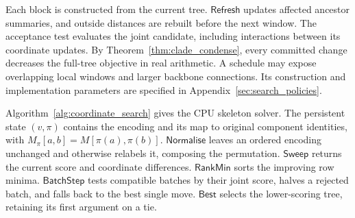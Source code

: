 \documentclass[11pt,a4paper]{article}
\makeatletter
\newcommand{\proc}[1]{\mathsf{#1}}
\DeclareRobustCommand{\_}{\ifmmode\nfss@text{\textunderscore}\else\textunderscore\allowbreak\fi}
\theoremstyle{definition}
\makeatother
\begin{document}
Each block is constructed from the current tree.
$\proc{Refresh}$ updates affected ancestor summaries, and outside distances are rebuilt before the next window.
The acceptance test evaluates the joint candidate, including interactions between its coordinate updates.
By Theorem~\ref{thm:clade_condense}, every committed change decreases the full-tree objective in real arithmetic.
A schedule may expose overlapping local windows and larger backbone connections. Its construction and implementation parameters are specified in Appendix~\ref{sec:search_policies}.

Algorithm~\ref{alg:coordinate_search} gives the CPU skeleton solver.
The persistent state $(v,\pi)$ contains the encoding and its map to original component identities, with $M_\pi[a,b]=M[\pi(a),\pi(b)]$.
$\proc{Normalise}$ leaves an ordered encoding unchanged and otherwise relabels it, composing the permutation.
$\proc{Sweep}$ returns the current score and coordinate differences. $\proc{RankMin}$ sorts the improving row minima.
$\proc{BatchStep}$ tests compatible batches by their joint score, halves a rejected batch, and falls back to the best single move.
$\proc{Best}$ selects the lower-scoring tree, retaining its first argument on a tie.
\end{document}
